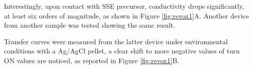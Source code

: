Interestingly, upon contact with SSE precursor, conductivity drops significantly, at least six orders of magnitude, as shown in Figure \ref{fig:revox1}A. Another device from another sample was tested showing the same result. 


Transfer curves were measured from the latter device under environmental conditions with a Ag/AgCl pellet, a clear shift to more negative values of turn ON values are noticed, as reported in Figure \ref{fig:revox1}B.


